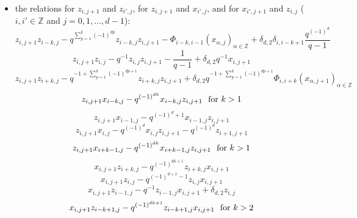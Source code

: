 \documentclass[reqno,12pt,a4paper]{amsart}
\theoremstyle{remark}
\theoremstyle{definition}
\numberwithin{equation}{section}
\begin{document}
\begin{itemize}
	
	\item[(2)] the relations for $z_{i,j+1}$ and $z_{i',j}$, for $z_{i,j+1}$ and $x_{i',j}$, and for $x_{i',j+1}$ and $z_{i,j}$ ($i,i'\in\mathbb{Z}$ and $j=0,1,\ldots,d-1$):
	\begin{equation*}
		z_{i,j+1}z_{i-k,j}-q^{\sum\limits_{p=1}^{k}(-1)^{dp} }z_{i-k,j}z_{i,j+1}-\Phi_{i-k,i-1}(x_{\alpha,j})_{\alpha\in\mathbb{Z}}+\delta_{d,2}\delta_{i,i-k+1}\frac{q^{(-1)^d}}{q-1}
	\end{equation*}
	\begin{equation}\label{relation:simple-by-projectives-$r=1$}
		z_{i,j+1}z_{i,j}-q^{-1}z_{i,j}z_{i,j+1}-\frac{1}{q-1}+\delta_{d,2}q^{-1}x_{i,j+1}
	\end{equation}
	\begin{equation*}
		z_{i,j+1}z_{i+k,j}-q^{-1+\sum\limits_{p=1}^{k}(-1)^{dp+1}}z_{i+k,j}z_{i,j+1}+\delta_{d,2}q^{-1+\sum\limits_{p=1}^{k}(-1)^{dp+1}}\Phi_{i,i+k}(x_{\alpha,j+1})_{\alpha\in\mathbb{Z}}
	\end{equation*}
	\begin{equation*}
		z_{i,j+1}x_{i-k,j}-q^{(-1)^{dk}}x_{i-k,j}z_{i,j+1}
		~\hbox{ for $k>1$}
	\end{equation*}
	\begin{equation*}
		z_{i,j+1}x_{i-1,j}-q^{(-1)^{d}+1 }x_{i-1,j}z_{i,j+1}
	\end{equation*}
	\begin{equation*}
		z_{i,j+1}x_{i,j}-q^{(-1)^{d}}x_{i,j}z_{i,j+1}-q^{(-1)^d}z_{i+1,j+1}
	\end{equation*}
	\begin{equation*}
		z_{i,j+1}x_{i+k-1,j}-q^{(-1)^{dk}}x_{i+k-1,j}z_{i,j+1}~\hbox{ for $k>1$}
	\end{equation*}
	\begin{equation*}
		x_{i,j+1}z_{i+k,j}-q^{(-1)^{dk+1}}z_{i+k,j}x_{i,j+1}
	\end{equation*}
	\begin{equation*}
		x_{i,j+1}z_{i,j}-q^{(-1)^{d+1}-1}z_{i,j}x_{i,j+1} 
	\end{equation*}
	\begin{equation*}
		x_{i,j+1}z_{i-1,j}-q^{-1}z_{i-1,j}x_{i,j+1}+\delta_{d,2}z_{i,j}
	\end{equation*}
	\begin{equation*}
		x_{i,j+1}z_{i-k+1,j}-q^{(-1)^{dk+1}}z_{i-k+1,j}x_{i,j+1} ~\hbox{ for $k>2$}
	\end{equation*}


\end{itemize}
\end{document}
